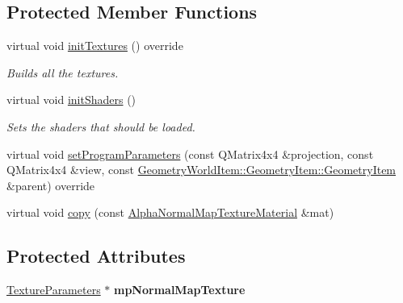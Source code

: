 \subsection*{Protected Member Functions}
\begin{DoxyCompactItemize}
\item 
\mbox{\label{class_geometry_engine_1_1_geometry_material_1_1_alpha_normal_map_texture_material_aeeed483e4828906e78b7436760b68cb2}} 
virtual void \mbox{\hyperlink{class_geometry_engine_1_1_geometry_material_1_1_alpha_normal_map_texture_material_aeeed483e4828906e78b7436760b68cb2}{init\+Textures}} () override
\begin{DoxyCompactList}\small\item\em Builds all the textures. \end{DoxyCompactList}\item 
\mbox{\label{class_geometry_engine_1_1_geometry_material_1_1_alpha_normal_map_texture_material_a5eedc8ad4d520fa3eecd7385b5b826cc}} 
virtual void \mbox{\hyperlink{class_geometry_engine_1_1_geometry_material_1_1_alpha_normal_map_texture_material_a5eedc8ad4d520fa3eecd7385b5b826cc}{init\+Shaders}} ()
\begin{DoxyCompactList}\small\item\em Sets the shaders that should be loaded. \end{DoxyCompactList}\item 
virtual void \mbox{\hyperlink{class_geometry_engine_1_1_geometry_material_1_1_alpha_normal_map_texture_material_a237fc12dc3eda51d90c16e95e6b2042c}{set\+Program\+Parameters}} (const Q\+Matrix4x4 \&projection, const Q\+Matrix4x4 \&view, const \mbox{\hyperlink{class_geometry_engine_1_1_geometry_world_item_1_1_geometry_item_1_1_geometry_item}{Geometry\+World\+Item\+::\+Geometry\+Item\+::\+Geometry\+Item}} \&parent) override
\item 
virtual void \mbox{\hyperlink{class_geometry_engine_1_1_geometry_material_1_1_alpha_normal_map_texture_material_acf15c4344df03bb0f4f8dbe64ab5b3a1}{copy}} (const \mbox{\hyperlink{class_geometry_engine_1_1_geometry_material_1_1_alpha_normal_map_texture_material}{Alpha\+Normal\+Map\+Texture\+Material}} \&mat)
\end{DoxyCompactItemize}
\subsection*{Protected Attributes}
\begin{DoxyCompactItemize}
\item 
\mbox{\label{class_geometry_engine_1_1_geometry_material_1_1_alpha_normal_map_texture_material_ae183a6b80de0f75a39db8ea3a8ed2fed}} 
\mbox{\hyperlink{class_geometry_engine_1_1_geometry_material_1_1_texture_parameters}{Texture\+Parameters}} $\ast$ {\bfseries mp\+Normal\+Map\+Texture}
\end{DoxyCompactItemize}
